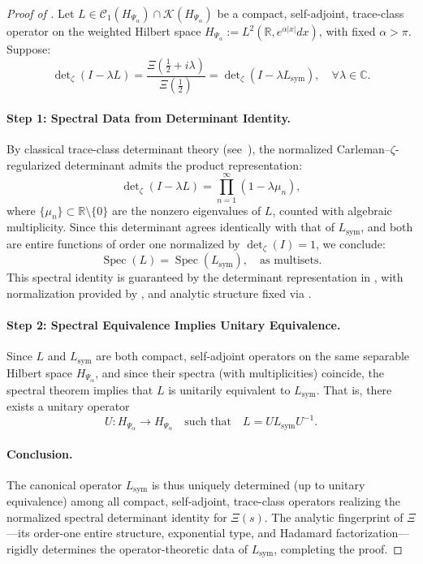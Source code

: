 \begin{proof}[Proof of ]
Let \( L \in \mathcal{C}_1(H_{\Psi_\alpha}) \cap \mathcal{K}(H_{\Psi_\alpha}) \) be a compact, self-adjoint, trace-class operator on the weighted Hilbert space \( H_{\Psi_\alpha} := L^2(\mathbb{R}, e^{\alpha|x|}dx) \), with fixed \( \alpha > \pi \). Suppose:
\[
\det\nolimits_\zeta(I - \lambda L) = \frac{\Xi\left(\tfrac{1}{2} + i\lambda\right)}{\Xi\left(\tfrac{1}{2}\right)}
= \det\nolimits_\zeta(I - \lambda L_{\mathrm{sym}}),
\quad \forall \lambda \in \mathbb{C}.
\]

\paragraph{Step 1: Spectral Data from Determinant Identity.}
By classical trace-class determinant theory (see~\cite[Thm. 4.2]{Simon2005TraceIdeals}), the normalized Carleman–\(\zeta\)-regularized determinant admits the product representation:
\[
\det\nolimits_\zeta(I - \lambda L)
= \prod_{n=1}^\infty (1 - \lambda \mu_n),
\]
where \( \{ \mu_n \} \subset \mathbb{R} \setminus \{0\} \) are the nonzero eigenvalues of \( L \), counted with algebraic multiplicity. Since this determinant agrees identically with that of \( L_{\mathrm{sym}} \), and both are entire functions of order one normalized by \( \det\nolimits_\zeta(I) = 1 \), we conclude:
\[
\operatorname{Spec}(L) = \operatorname{Spec}(L_{\mathrm{sym}}),
\quad \text{as multisets}.
\]
This spectral identity is guaranteed by the determinant representation in , with normalization provided by , and analytic structure fixed via .

\paragraph{Step 2: Spectral Equivalence Implies Unitary Equivalence.}
Since \( L \) and \( L_{\mathrm{sym}} \) are both compact, self-adjoint operators on the same separable Hilbert space \( H_{\Psi_\alpha} \), and since their spectra (with multiplicities) coincide, the spectral theorem implies that \( L \) is unitarily equivalent to \( L_{\mathrm{sym}} \). That is, there exists a unitary operator
\[
U \colon H_{\Psi_\alpha} \to H_{\Psi_\alpha}
\quad \text{such that} \quad
L = U L_{\mathrm{sym}} U^{-1}.
\]

\paragraph{Conclusion.}
The canonical operator \( L_{\mathrm{sym}} \) is thus uniquely determined (up to unitary equivalence) among all compact, self-adjoint, trace-class operators realizing the normalized spectral determinant identity for \( \Xi(s) \). The analytic fingerprint of \( \Xi \)—its order-one entire structure, exponential type, and Hadamard factorization—rigidly determines the operator-theoretic data of \( L_{\mathrm{sym}} \), completing the proof.
\end{proof}
